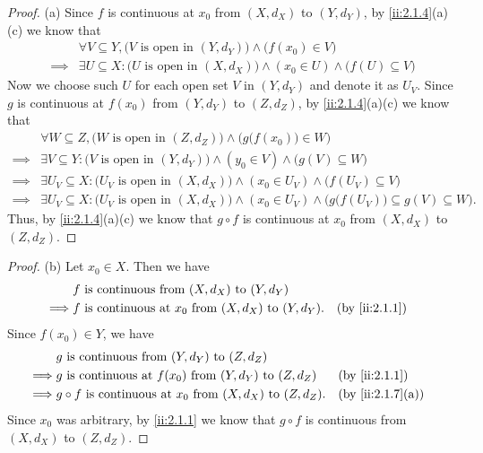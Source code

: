 \begin{proof}{(a)}
  Since \(f\) is continuous at \(x_0\) from \((X, d_X)\) to \((Y, d_Y)\), by \cref{ii:2.1.4}(a)(c) we know that
  \begin{align*}
             & \forall V \subseteq Y, \big(V \text{ is open in } (Y, d_Y)\big) \land \big(f(x_0) \in V\big)                        \\
    \implies & \exists U \subseteq X : \big(U \text{ is open in } (X, d_X)\big) \land (x_0 \in U) \land \big(f(U) \subseteq V\big)
  \end{align*}
  Now we choose such \(U\) for each open set \(V\) in \((Y, d_Y)\) and denote it as \(U_V\).
  Since \(g\) is continuous at \(f(x_0)\) from \((Y, d_Y)\) to \((Z, d_Z)\), by \cref{ii:2.1.4}(a)(c) we know that
  \begin{align*}
             & \forall W \subseteq Z, \big(W \text{ is open in } (Z, d_Z)\big) \land \Big(g\big(f(x_0)\big) \in W\Big)                                                \\
    \implies & \exists V \subseteq Y : \big(V \text{ is open in } (Y, d_Y)\big) \land (y_0 \in V) \land \big(g(V) \subseteq W\big)                                    \\
    \implies & \exists U_V \subseteq X : \big(U_V \text{ is open in } (X, d_X)\big) \land (x_0 \in U_V) \land \big(f(U_V) \subseteq V\big)                            \\
    \implies & \exists U_V \subseteq X : \big(U_V \text{ is open in } (X, d_X)\big) \land (x_0 \in U_V) \land \Big(g\big(f(U_V)\big) \subseteq g(V) \subseteq W\Big).
  \end{align*}
  Thus, by \cref{ii:2.1.4}(a)(c) we know that \(g \circ f\) is continuous at \(x_0\) from \((X, d_X)\) to \((Z, d_Z)\).
\end{proof}

\begin{proof}{(b)}
  Let \(x_0 \in X\).
  Then we have
  \begin{align*}
             & f \text{ is continuous from } (X, d_X) \text{ to } (Y, d_Y)                                     \\
    \implies & f \text{ is continuous at } x_0 \text{ from } (X, d_X) \text{ to } (Y, d_Y). &  & \by{ii:2.1.1}
  \end{align*}
  Since \(f(x_0) \in Y\), we have
  \begin{align*}
             & g \text{ is continuous from } (Y, d_Y) \text{ to } (Z, d_Z)                                                \\
    \implies & g \text{ is continuous at } f(x_0) \text{ from } (Y, d_Y) \text{ to } (Z, d_Z)       &  & \by{ii:2.1.1}    \\
    \implies & g \circ f \text{ is continuous at } x_0 \text{ from } (X, d_X) \text{ to } (Z, d_Z). &  & \by{ii:2.1.7}[a]
  \end{align*}
  Since \(x_0\) was arbitrary, by \cref{ii:2.1.1} we know that \(g \circ f\) is continuous from \((X, d_X)\) to \((Z, d_Z)\).
\end{proof}

